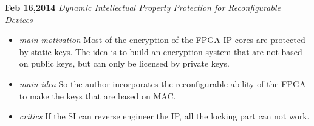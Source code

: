\documentclass[]{article}
\begin{document}
\noindent \textbf{Feb 16,2014}
\textit{Dynamic Intellectual Property Protection for Reconfigurable Devices}
\indent		\begin{itemize}
            \item \textit{main motivation} Most of the encryption of the FPGA IP
            cores are protected by static keys. The idea is to build an
            encryption system that are not based on public keys, but can only be
            licensed by private keys.
            \item \textit{main idea} So the author incorporates the
            reconfigurable ability of the FPGA to make the keys that are based
            on MAC.
            \item \textit{critics} If the SI can reverse engineer the IP, all
            the locking part can not work.
            \end{itemize}
\end{document}
